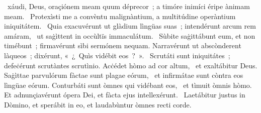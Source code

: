 { }
{%
~xáudi, Deus, oraçiónem meam quum déprecor~; a timóre inimíci éripe ànimam meam. 
~Protexìsti me a convèntu malignàntium, a multitúdine operàntium iniquitátem. 
~Quia exacuvérunt ut glàdium lìngüas suas~; intendérunt arcum rem amáram, 
~ut saġìttent in occùltïs immaculátum. 
~Sùbite saġittábunt eum, et non timébunt~; firmavérunt sìbi sermónem nequam. Narravérunt ut abscònderent làqueos~; dixérunt, «~¿~Quìs vidébit eos~?~». 
~Scrutáti sunt iniquitátes~; defeċérunt scrutàntes scrutìnio. Acċédet hòmo ad cor altum, 
~et exaltábitur Deus. Saġìttae parvulórum fàctae sunt plagae eórum, 
~et infirmátae sunt còntra eos lìngüae eórum. Conturbáti sunt òmnes qui vidébant eos, 
~et tìmuit òmnis hòmo. Et adnunçiavérunt ópera Dei, et fàcta ejus intellexérunt. 
~Laetábitur justus in Dòmino, et sperábit in eo, et laudabùntur òmnes recti corde. 
}
